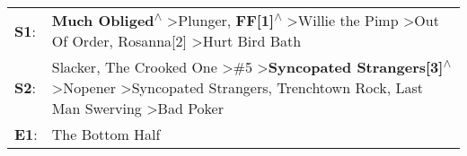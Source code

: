 \begin{supertabular}{p{0.03\textwidth}p{0.92\textwidth}}
 \textbf{S1}:  &                                                                                                \textbf{Much Obliged\textsuperscript{$\wedge$}} \textgreater \enspace Plunger\textsuperscript{}, \enspace \textbf{FF[1]\textsuperscript{$\wedge$}} \textgreater \enspace Willie the Pimp\textsuperscript{} \textgreater \enspace Out Of Order\textsuperscript{}, \enspace Rosanna[2]\textsuperscript{} \textgreater \enspace Hurt Bird Bath\textsuperscript{}  \enspace  \\
 \textbf{S2}:  &  Slacker\textsuperscript{}, \enspace The Crooked One\textsuperscript{} \textgreater \enspace \#5\textsuperscript{} \textgreater \enspace \textbf{Syncopated Strangers[3]\textsuperscript{$\wedge$}} \textgreater \enspace Nopener\textsuperscript{} \textgreater \enspace Syncopated Strangers\textsuperscript{}, \enspace Trenchtown Rock\textsuperscript{}, \enspace Last Man Swerving\textsuperscript{} \textgreater \enspace Bad Poker\textsuperscript{}  \enspace  \\
 \textbf{E1}:  &                                                                                                                                                                                                                                                                                                                                                                                                                            The Bottom Half\textsuperscript{}  \enspace  \\
\end{supertabular}
